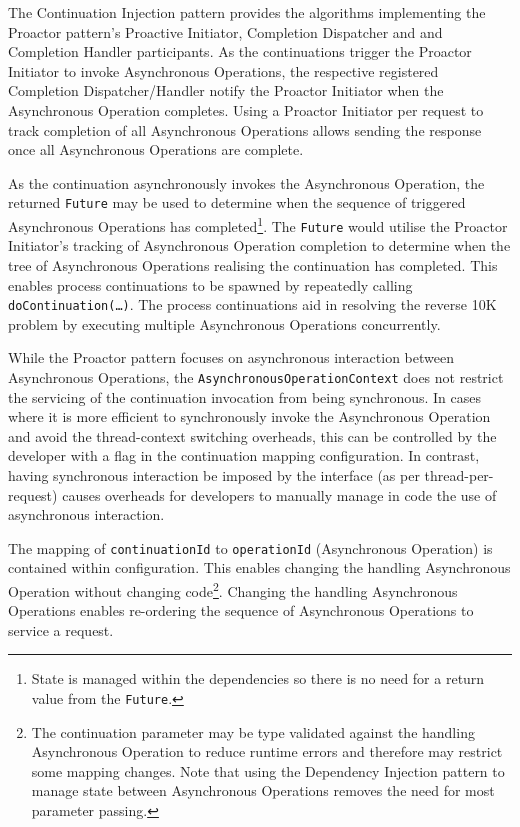 \documentclass[prodmode]{style/acmlarge}
\begin{document}
The Continuation Injection pattern provides the algorithms implementing the
Proactor pattern's Proactive Initiator, Completion Dispatcher and and Completion
Handler participants.  As the continuations trigger the Proactor Initiator to
invoke Asynchronous Operations, the respective registered Completion
Dispatcher/Handler notify the Proactor Initiator when the Asynchronous Operation
completes.  Using a Proactor Initiator per request to track completion of all
Asynchronous Operations allows sending the response once all Asynchronous
Operations are complete.

As the continuation asynchronously invokes the Asynchronous Operation, the
returned \texttt{Future} may be used to determine when the sequence of triggered
Asynchronous Operations has completed\footnote{State is managed within the
dependencies so there is no need for a return value from the \texttt{Future}.}.
The \texttt{Future} would utilise the Proactor Initiator's tracking of
Asynchronous Operation completion to determine when the tree of Asynchronous
Operations realising the continuation has completed.  This enables process
continuations \cite{process-continuation} to be spawned by repeatedly calling
\texttt{doContinuation(\ldots)}.  The process continuations aid in resolving the
reverse 10K problem \cite{reverse-ten-k-problem} by executing multiple
Asynchronous Operations concurrently.

While the Proactor pattern focuses on asynchronous interaction between
Asynchronous Operations, the \texttt{AsynchronousOperationContext} does not
restrict the servicing of the continuation invocation from being synchronous.
In cases where it is more efficient to synchronously invoke the Asynchronous
Operation and avoid the thread-context switching overheads, this can be
controlled by the developer with a flag in the continuation mapping
configuration.  In contrast, having synchronous interaction be imposed by the
interface (as per thread-per-request) causes overheads for developers to
manually manage in code the use of asynchronous interaction.

The mapping of \texttt{continuationId} to \texttt{operationId} (Asynchronous
Operation) is contained within configuration.  This enables changing the
handling Asynchronous Operation without changing code\footnote{The continuation
parameter may be type validated against the handling Asynchronous Operation to
reduce runtime errors and therefore may restrict some mapping changes.  Note
that using the Dependency Injection pattern to manage state between Asynchronous
Operations removes the need for most parameter passing.}.  Changing the handling
Asynchronous Operations enables re-ordering the sequence of Asynchronous
Operations to service a request.
\end{document}
